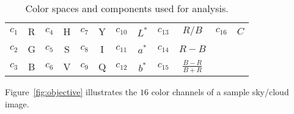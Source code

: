 \begin{table}[htbp]
\normalsize
\centering
\setlength{\tabcolsep}{4pt} %
\begin{tabular}{c|c||c|c||c|c||c|c||c|c||c|c}
  \hline
  $c_{1}$ & R & $c_{4}$ & H & $c_{7}$ & Y & $c_{10}$ & $L^{*}$ & $c_{13}$ & $R/B$ & $c_{16}$ & $C$\\
  $c_{2}$ & G & $c_{5}$ & S & $c_{8}$ & I & $c_{11}$ & $a^{*}$ & $c_{14}$ & $R-B$& $ $ & $ $\\
  $c_{3}$ & B & $c_{6}$ & V & $c_{9}$ & Q & $c_{12}$ & $b^{*}$ & $c_{15}$ & $\frac{B-R}{B+R}$ & $ $ & $ $\\
  \hline
\end{tabular}
\caption{Color spaces and components used for analysis.}
\label{ps}
\end{table}

Figure~\ref{fig:objective} illustrates the $16$ color channels of a sample sky/cloud image. 

